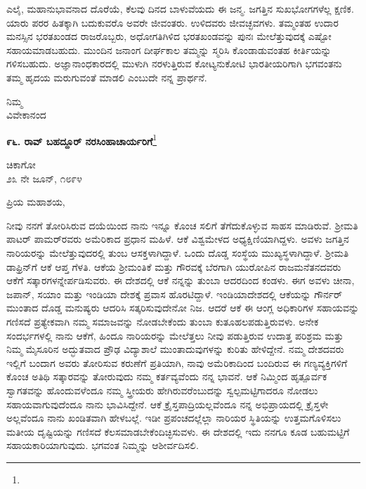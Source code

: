 ಎಲೈ, ಮಹಾನುಭಾವನಾದ ದೊರೆಯೆ, ಕೆಲವು ದಿನದ ಬಾಳುವೆಯದು ಈ ಜನ್ಮ. ಜಗತ್ತಿನ ಸುಖಭೋಗಗಳೆಲ್ಲ ಕ್ಷಣಿಕ. ಯಾರು ಪರರ ಹಿತಕ್ಕಾಗಿ ಬದುಕುವರೊ ಅವರೇ ಜೀವಂತರು. ಉಳಿದವರು ಜೀವಚ್ಛವಗಳು. ತಮ್ಮಂತಹ ಉದಾರ ಮನಸ್ಸಿನ ಭರತಖಂಡದ ರಾಜರೊಬ್ಬರು, ಅಧೋಗತಿಗಿಳಿದ ಭರತಖಂಡವನ್ನು ಪುನಃ ಮೇಲೆತ್ತುವುದಕ್ಕೆ ಎಷ್ಟೋ ಸಹಾಯಮಾಡಬಹುದು. ಮುಂದಿನ ಜನಾಂಗ ದೀರ್ಘಕಾಲ ತಮ್ಮನ್ನು ಸ್ಮರಿಸಿ ಕೊಂಡಾಡುವಂತಹ ಕೀರ್ತಿಯನ್ನು ಗಳಿಸಬಹುದು. ಅಜ್ಞಾನಾಂಧಕಾರದಲ್ಲಿ ಮುಳುಗಿ ನರಳು\-ತ್ತಿರುವ ಕೋಟ್ಯನುಕೋಟಿ ಭಾರತೀಯರಿಗಾಗಿ ಭಗವಂತನು ತಮ್ಮ ಹೃದಯ ಮರುಗುವಂತೆ ಮಾಡಲಿ ಎಂಬುದೇ ನನ್ನ ಪ್ರಾರ್ಥನೆ.
\vspace{-0.5cm}

{\flushright
ನಿಮ್ಮ\\ವಿವೇಕಾನಂದ\par}
\newpage

\begin{center}
\textbf{೯೬. ರಾವ್ ಬಹದ್ದೂರ್ ನರಸಿಂಹಾಚಾರ್ಯರಿಗೆ}\footnote{}
\end{center}
\vspace{-0.5cm}

\begin{flushright}
ಚಿಕಾಗೋ\\೨೩ ನೇ ಜೂನ್, ೧೮೯೪
\end{flushright}

\noindent
ಪ್ರಿಯ ಮಹಾಶಯ,

ನೀವು ನನಗೆ ತೋರಿಸಿರುವ ದಯೆಯಿಂದ ನಾನು ಇನ್ನೂ ಕೊಂಚ ಸಲಿಗೆ ತೆಗೆದುಕೊಳ್ಳುವ ಸಾಹಸ ಮಾಡಿರುವೆ. ಶ‍್ರೀಮತಿ ಪಾಟರ್ ಪಾಮರ್‌ರವರು ಅಮೆರಿಕಾದ ಪ್ರಧಾನ ಮಹಿಳೆ. ಆಕೆ ವಿಶ್ವಮೇಳದ ಅಧ್ಯಕ್ಷಿಣಿಯಾಗಿದ್ದಳು. ಅವಳು ಜಗತ್ತಿನ ನಾರಿಯರನ್ನು ಮೇಲೆತ್ತುವುದರಲ್ಲಿ ತುಂಬ ಆಸಕ್ತಳಾಗಿದ್ದಾಳೆ. ಒಂದು ದೊಡ್ಡ ಸಂಸ್ಥೆಯ ಮುಖ್ಯ\break ಸ್ಥಳಾಗಿದ್ದಾಳೆ. ಶ‍್ರೀಮತಿ ಡಾಫ್ರಿನ್‌ಗೆ ಆಕೆ ಆಪ್ತ ಗೆಳತಿ. ಆಕೆಯ ಶ‍್ರೀಮಂತಿಕೆ ಮತ್ತು ಗೌರವಕ್ಕೆ ಬೆರಗಾಗಿ ಯುರೋಪಿನ ರಾಜಮನೆತನದವರು ಆಕೆಗೆ ಸತ್ಕಾರಗಳನ್ನೇರ್ಪಡಿಸುವರು. ಈ ದೇಶದಲ್ಲಿ ಆಕೆ ನನ್ನನ್ನು ತುಂಬಾ ಆದರದಿಂದ ಕಂಡಳು. ಈಗ ಅವಳು ಚೀನಾ, ಜಪಾನ್, ಸಯಾಂ ಮತ್ತು ಇಂಡಿಯಾ ದೇಶಕ್ಕೆ ಪ್ರವಾಸ ಹೊರಟಿದ್ದಾಳೆ. ಇಂಡಿಯಾದೇಶದಲ್ಲಿ ಆಕೆಯನ್ನು ಗೌರ್ನ‌ರ್ ಮುಂತಾದ ದೊಡ್ಡ ಮನುಷ್ಯರು ಆದರಿಸಿ ಸತ್ಕರಿಸುವುದೇನೋ ನಿಜ. ಆದರೆ ಆಕೆ ಈ ಆಂಗ್ಲ ಅಧಿಕಾರಿಗಳ ಸಹಾಯವನ್ನು ಗಣಿಸದೆ ಪ್ರತ್ಯೇಕವಾಗಿ ನಮ್ಮ ಸಮಾಜವನ್ನು ನೋಡಬೇಕೆಂದು ತುಂಬಾ ಕುತೂಹಲಪಡುತ್ತಿರುವಳು. ಅನೇಕ ಸಂದರ್ಭಗಳಲ್ಲಿ ನಾನು ಆಕೆಗೆ, ಹಿಂದೂ ನಾರಿಯರನ್ನು ಮೇಲೆತ್ತಲು ನೀವು ಪಡುತ್ತಿರುವ ಉದಾತ್ತ ಪರಿಶ್ರಮ ಮತ್ತು ನಿಮ್ಮ ಮೈಸೂರಿನ ಅದ್ಭುತವಾದ ಪ್ರೌಢ ವಿದ್ಯಾಶಾಲೆ ಮುಂತಾದುವುಗಳನ್ನು ಕುರಿತು ಹೇಳಿದ್ದೇನೆ. ನಮ್ಮ ದೇಶದವರು ಇಲ್ಲಿಗೆ ಬಂದಾಗ ಅವರು ತೋರಿಸುವ ಕರುಣೆಗೆ ಪ್ರತಿಯಾಗಿ, ನಾವು ಅಮೆರಿಕಾದಿಂದ ಬಂದಿರುವ ಈ ಗಣ್ಯವ್ಯಕ್ತಿಗಳಿಗೆ ಕೊಂಚ ಅತಿಥಿ ಸತ್ಕಾರವನ್ನು ತೋರುವುದು ನಮ್ಮ ಕರ್ತವ್ಯವೆಂದು ನನ್ನ ಭಾವನೆ. ಆಕೆ ನಿಮ್ಮಿಂದ ಹೃತ್ಪೂರ್ವಕ ಸ್ವಾಗತವನ್ನು ಹೊಂದುವಳೆಂದೂ ನಮ್ಮ ಸ್ತ್ರೀಯರು ಹೇಗಿರುವರೆಂಬುದನ್ನು ಸ್ವಲ್ಪಮಟ್ಟಿಗಾದರೂ ನೋಡಲು ಸಹಾಯವಾಗುವುದೆಂದೂ ನಾನು ಭಾವಿಸಿದ್ದೇನೆ. ಆಕೆ ಕ್ರೈಸ್ತಪಾದ್ರಿಯಲ್ಲವೆಂದೂ ನನ್ನ ಅಭಿಪ್ರಾಯದಲ್ಲಿ ಕ್ರೈಸ್ತಳೇ ಅಲ್ಲವೆಂದೂ ನಾನು ಖಂಡಿತವಾಗಿ ಹೇಳಬಲ್ಲೆ. ಇಡೀ ಪ್ರಪಂಚದಲ್ಲೆಲ್ಲಾ ನಾರಿಯರ ಸ್ಥಿತಿಯನ್ನು ಉತ್ತಮಗೊಳಿಸಲು ಮತೀಯ ದೃಷ್ಟಿಯನ್ನು ಗಣಿಸದೆ ಕೆಲಸಮಾಡಬೇಕೆಂದಿಚ್ಛಿಸುವಳು. ಈ ದೇಶದಲ್ಲಿ ಇದು ನನಗೂ ಕೂಡ ಬಹುಮಟ್ಟಿಗೆ ಸಹಾಯಕಾರಿಯಾಗುವುದು. ಭಗವಂತ ನಿಮ್ಮನ್ನು ಆಶೀರ್ವದಿಸಲಿ.

